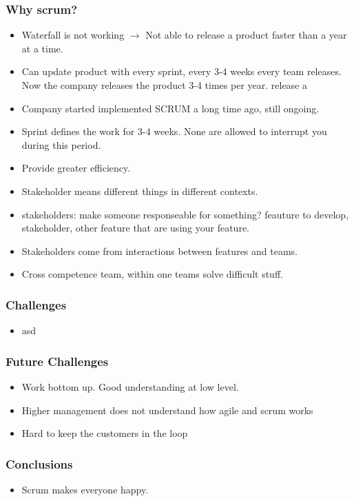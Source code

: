 \documentclass{beamer}
\begin{document}
\begin{frame}
  \frametitle{Why scrum?}
  \begin{itemize}

  \item Waterfall is not working $\rightarrow$ Not able to release a
    product faster than a year at a time.
  \item Can update product with every sprint, every 3-4 weeks every
    team releases. Now the company releases the product 3-4 times per year.
    release a
  \item Company started implemented SCRUM a long time ago, still
    ongoing.
  \item Sprint defines the work for 3-4 weeks. None are allowed to
    interrupt you during this period.
  \item Provide greater efficiency.
  \item Stakeholder means different things in different contexts.
  \item stakeholders: make someone responseable for something?
    feauture to develop, stakeholder, other feature that are using
    your feature.
  \item Stakeholders come from interactions between features and teams.
  \item Cross competence team, within one teams solve difficult stuff.

  \end{itemize}
\end{frame}

\begin{frame}
  \frametitle{Challenges}
  \begin{itemize}
  \item asd
  \end{itemize}
\end{frame}

\begin{frame}
  \frametitle{Future Challenges}
  \begin{itemize}
  \item Work bottom up. Good understanding at low level. 
  \item Higher management does not understand how agile and scrum works
  \item Hard to keep the customers in the loop
  \end{itemize}
\end{frame}

\begin{frame}
  \frametitle{Conclusions}
  \begin{itemize}
  \item Scrum makes everyone happy.
  \end{itemize}
\end{frame}
\end{document}
